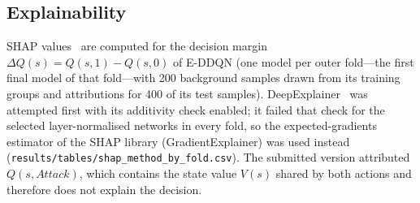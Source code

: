 \subsection{Explainability}
\label{sec:shap}
SHAP values~\cite{lundberg2017shap} are computed for the decision margin $\Delta Q(s)=Q(s,1)-Q(s,0)$ of E-DDQN (one model per outer fold---the first final model of that fold---with 200 background samples drawn from its training groups and attributions for 400 of its test samples). DeepExplainer~\cite{shrikumar2017deeplift} was attempted first with its additivity check enabled; it failed that check for the selected layer-normalised networks in every fold, so the expected-gradients estimator of the SHAP library (GradientExplainer) was used instead (\texttt{results/\allowbreak tables/\allowbreak shap\_method\_by\_fold.csv}). The submitted version attributed $Q(s,\textit{Attack})$, which contains the state value $V(s)$ shared by both actions and therefore does not explain the decision.
